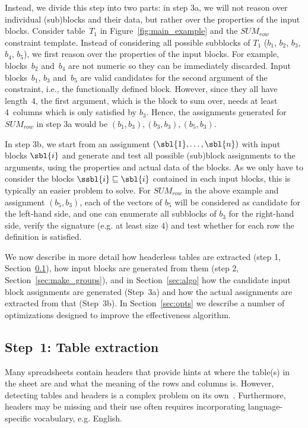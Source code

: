 Instead, we divide this step into two parts: in step 3a, we will not reason over individual (sub)blocks and their data, but rather over the properties of the input blocks.
Consider table~$T_1$ in Figure~\ref{fig:main_example} and the $\textit{SUM}_{row}$ constraint template. %
Instead of considering all possible subblocks of $T_1$ ($b_1$, $b_2$, $b_3$, $b_4$, $b_5$), we first reason over the properties of the input blocks.
For example, blocks~$b_2$ and~$b_4$  are not numeric so they can be immediately discarded.
Input blocks~$b_1$, $b_3$ and~$b_5$ are valid candidates for the second argument of the constraint, i.e., the functionally defined block.
However, since they all have length~4, the first argument, which is the block to sum over, needs at least 4~columns which is only satisfied by $b_3$.
Hence, the assignments generated for $\textit{SUM}_{row}$ in step 3a would be $(b_1, b_3), (b_3, b_3), (b_5, b_3)$.

In step 3b, we start from an assignment $(\sbl{1}, \ldots, \sbl{n})$ with input blocks $\sbl{i}$ and generate and test all possible (sub)block assignments to the arguments, using the properties and actual data of the blocks.
As we only have to consider the blocks $\ssbl{i} \sqsubseteq \sbl{i}$ contained in each input blocks, this is typically an easier problem to solve.
For $\textit{SUM}_{row}$ in the above example and assignment $(b_5, b_3)$, each of the vectors of $b_5$ will be considered as candidate for the left-hand side, and one can enumerate all subblocks of $b_3$ for the right-hand side, verify the signature (e.g. at least size $4$) and test whether for each row the definition is satisfied. %

We now describe in more detail how headerless tables are extracted (step 1, Section~\ref{sec:table_extraction}), how input blocks are generated from them (step 2, Section~\ref{sec:make_groups}), and in Section~\ref{sec:algo} how the candidate input block assignments are generated (Step~3a) %
and how the actual assignments are extracted from that (Step~3b).
In Section~\ref{sec:opts} we describe a number of optimizations designed to improve the effectiveness algorithm.





\subsection{Step~1: Table extraction}
\label{sec:table_extraction}
Many spreadsheets contain headers that provide hints at where the table(s) in the sheet are and what the meaning of the rows and columns is. However, detecting tables and headers is a complex problem on its own~\parencite{header}. Furthermore, headers may be missing and their use often requires incorporating language-specific vocabulary, e.g. English.

